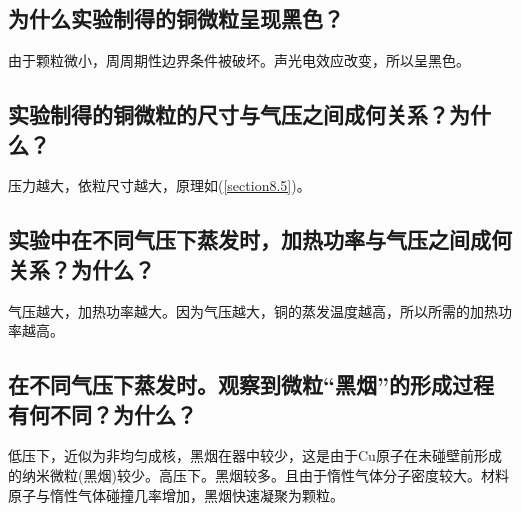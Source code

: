 \documentclass[a4paper]{article}
\begin{document}
\subsection{为什么实验制得的铜微粒呈现黑色？}
由于颗粒微小，周周期性边界条件被破坏。声光电效应改变，所以呈黑色。
\subsection{实验制得的铜微粒的尺寸与气压之间成何关系？为什么？}
压力越大，依粒尺寸越大，原理如(\ref{section8.5})。
\subsection{实验中在不同气压下蒸发时，加热功率与气压之间成何关系？为什么？}
气压越大，加热功率越大。因为气压越大，铜的蒸发温度越高，所以所需的加热功率越高。
\subsection{在不同气压下蒸发时。观察到微粒“黑烟”的形成过程有何不同？为什么？}
低压下，近似为非均匀成核，黑烟在器中较少，这是由于Cu原子在未碰壁前形成的纳米微粒(黑烟)较少。高压下。黑烟较多。且由于惰性气体分子密度较大。材料原子与惰性气体碰撞几率增加，黑烟快速凝聚为颗粒。

\nocite{jiaocai}

\end{document}
